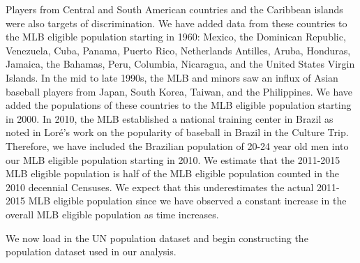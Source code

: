 \documentclass[11pt]{article}\usepackage[]{graphicx}\usepackage[]{color}
\begin{document}
Players from Central and South American countries and the Caribbean islands 
were also targets of discrimination.
We have added data from these countries to the MLB eligible population starting 
in 1960:
Mexico, 
the Dominican Republic, 
Venezuela, 
Cuba, 
Panama, 
Puerto Rico, 
Netherlands Antilles, 
Aruba, 
Honduras, 
Jamaica, 
the Bahamas, 
Peru, 
Columbia, 
Nicaragua, 
and the United States Virgin Islands.  
In the mid to late 1990s, the MLB and minors saw an influx of Asian baseball 
players from Japan, South Korea, Taiwan, and the Philippines.  
We have added the populations of these countries to the MLB eligible population 
starting in 2000.  In 2010, the MLB established a national training center in 
Brazil as noted in Lor{\'e}'s work on the popularity of baseball in Brazil in 
the Culture Trip.  Therefore, we have included the Brazilian population of 
20-24 year old men into our MLB eligible population starting in 2010.  
We estimate that the 2011-2015 MLB eligible population is half of the 
MLB eligible population counted in the 2010 decennial Censuses.  We expect 
that this underestimates the actual 2011-2015 MLB eligible population 
since we have observed a constant increase in the overall MLB eligible 
population as time increases. 

We now load in the UN population dataset and begin constructing the population 
dataset used in our analysis.
\end{document}
